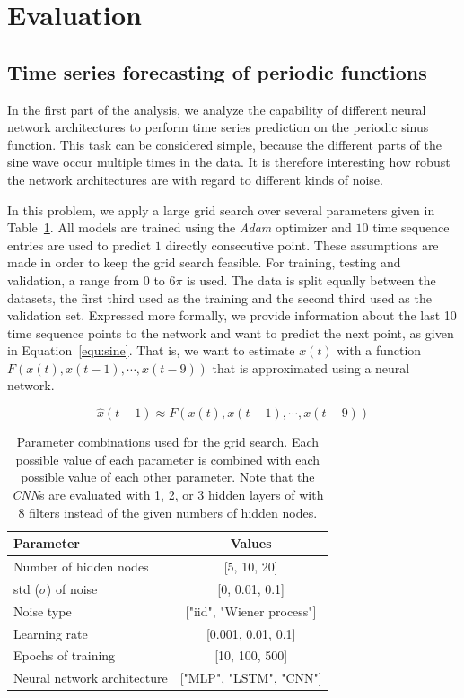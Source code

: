 
\section{Evaluation}
\subsection{Time series forecasting of periodic functions}
\label{sec:sine}
In the first part of the analysis, we analyze the capability of different neural
network architectures to perform time series prediction on the periodic sinus
function. This task can be considered simple, because the different parts of the
sine wave occur multiple times in the data.
It is therefore interesting how
robust the network architectures are with regard to different kinds of noise.

In this problem, we apply a large grid search over several parameters given in
Table~\ref{tab:gridparameters}. All models are trained using the \emph{Adam}
optimizer and $10$ time sequence entries are used to predict $1$ directly
consecutive point. These assumptions are made in order to keep the grid search
feasible. For training, testing and validation, a range from $0$ to $6 \pi$ is
used. The data is split equally between the datasets, the first third used as 
the training and the second third used as the validation set.
Expressed more formally,
we provide information about the last 10 time sequence points
to the network and want to predict the next point, as given in
Equation~\ref{equ:sine}. That is, we want to estimate $x(t)$ with a function
$F(x(t), x(t-1), \cdots, x(t-9))$ that is approximated using a neural network.

\begin{equation}
    \hat{x} (t + 1) \approx F(x(t), x(t-1), \cdots, x(t-9))
    \label{equ:sine}
\end{equation}


\begin{table}
    \centering
    \begin{tabular}{l|c}
        Parameter                   & Values                    \\
        \hline
        Number of hidden nodes      & [5, 10, 20]               \\
        std ($\sigma$) of noise     & [0, 0.01, 0.1]            \\
        Noise type                  & ["iid", "Wiener process"] \\
        Learning rate               & [0.001, 0.01, 0.1]        \\
        Epochs of training          & [10, 100, 500]            \\
        Neural network architecture & ["MLP", "LSTM", "CNN"]    \\
    \end{tabular}
    \caption{Parameter combinations used for the grid search. Each possible value
        of each parameter is combined with each possible value of each other
        parameter. Note that the \emph{CNN}s are evaluated with 1, 2, or 3 hidden
        layers of with 8 filters instead of the given numbers of hidden nodes.}
    \label{tab:gridparameters}
\end{table}

